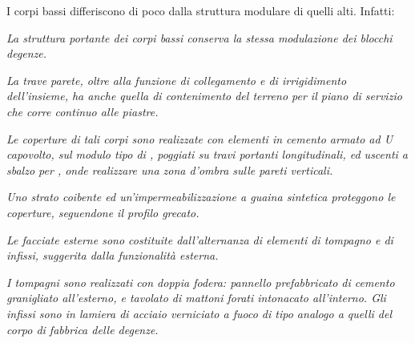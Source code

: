 \noindent I corpi bassi differiscono di poco dalla struttura modulare di quelli alti. Infatti:
\begin{quoting}
	\emph{La struttura portante dei corpi bassi conserva la stessa modulazione dei blocchi degenze.}

\sdots

	\emph{La trave parete, oltre alla funzione di collegamento e di irrigidimento dell'insieme, ha anche quella di contenimento del terreno per il piano di servizio che corre continuo alle piastre.}
	
	\emph{Le coperture di tali corpi sono realizzate con elementi in cemento armato ad U capovolto, sul modulo tipo di , poggiati su travi portanti longitudinali, ed uscenti a sbalzo per , onde realizzare una zona d'ombra sulle pareti verticali.}

\sdots

	\emph{Uno strato coibente ed un'impermeabilizzazione a guaina sintetica proteggono le coperture, seguendone il profilo grecato.}

\sdots

	\emph{Le facciate esterne sono costituite dall'alternanza di elementi di tompagno e di infissi, suggerita dalla funzionalità esterna.}
	
	\emph{I tompagni sono realizzati con doppia fodera: pannello prefabbricato di cemento granigliato all'esterno, e tavolato di mattoni forati intonacato all'interno. Gli infissi sono in lamiera di acciaio verniciato a fuoco di tipo analogo a quelli del corpo di fabbrica delle degenze.}
\end{quoting}

